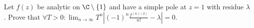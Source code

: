 Let $f(z)$ be analytic on $\C\setminus \{1\}$ and have a simple pole
at $z=1$ with residue $\lambda$. Prove that $\forall
T>0:\lim_{n\rightarrow
\infty}T^n|(-1)^n\frac{f^{(n)(2)}}{n!}-\lambda|=0$.
